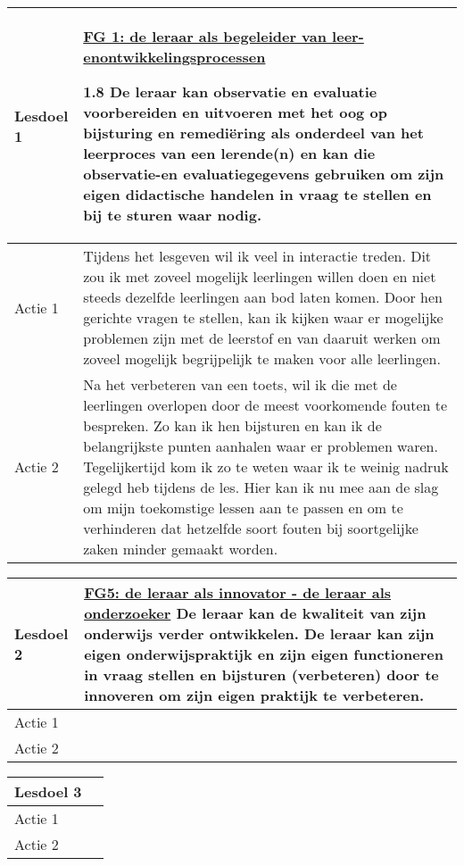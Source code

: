 \documentclass[a4paper,12pt,twoside]{article}%
\begin{document}
\begin{tabular}{|p{}|p{}|}
	\hline
	\textbf{Lesdoel 1} & 
	\underline{FG 1: de leraar als begeleider van leer-en}\newline \underline{ontwikkelingsprocessen}\newline
	
	1.8 De leraar kan observatie en evaluatie voorbereiden en uitvoeren met het oog op bijsturing en remediëring als onderdeel van het leerproces van een lerende(n) en kan die observatie-en evaluatiegegevens gebruiken om zijn eigen didactische handelen in vraag te stellen en bij te sturen waar nodig.\\ \hline
	Actie 1 & Tijdens het lesgeven wil ik veel in interactie treden. Dit zou ik met zoveel mogelijk leerlingen willen doen en niet steeds dezelfde leerlingen aan bod laten komen. Door hen gerichte vragen te stellen, kan ik kijken waar er mogelijke problemen zijn met de leerstof en van daaruit werken om zoveel mogelijk begrijpelijk te maken voor alle leerlingen. \\ \hline
	Actie 2 & Na het verbeteren van een toets, wil ik die met de leerlingen overlopen door de meest voorkomende fouten te bespreken. Zo kan ik hen bijsturen en kan ik de belangrijkste punten aanhalen waar er problemen waren. Tegelijkertijd kom ik zo te weten waar ik te weinig nadruk gelegd heb tijdens de les. Hier kan ik nu mee aan de slag om mijn toekomstige lessen aan te passen en om te verhinderen dat hetzelfde soort fouten bij soortgelijke zaken minder gemaakt worden. \\ \hline
\end{tabular}

\vspace{0.5cm}
\begin{tabular}{|p{}|p{}|}
\hline
\textbf{Lesdoel 2} & \underline{FG5:  de leraar als innovator - de leraar als onderzoeker}\newline
5.1 De leraar kan de kwaliteit van zijn onderwijs verder ontwikkelen. De leraar kan zijn eigen onderwijspraktijk en zijn eigen functioneren in vraag stellen en bijsturen (verbeteren) door te innoveren om zijn eigen praktijk te verbeteren.\\ \hline
Actie 1 & \\ \hline
Actie 2 & \\ \hline
\end{tabular}

\vspace{0.5cm}
\begin{tabular}{|p{}|p{}|}
\hline
\textbf{Lesdoel 3} & \\ \hline
Actie 1 & \\ \hline
Actie 2 & \\ \hline
\end{tabular}
\end{document}
